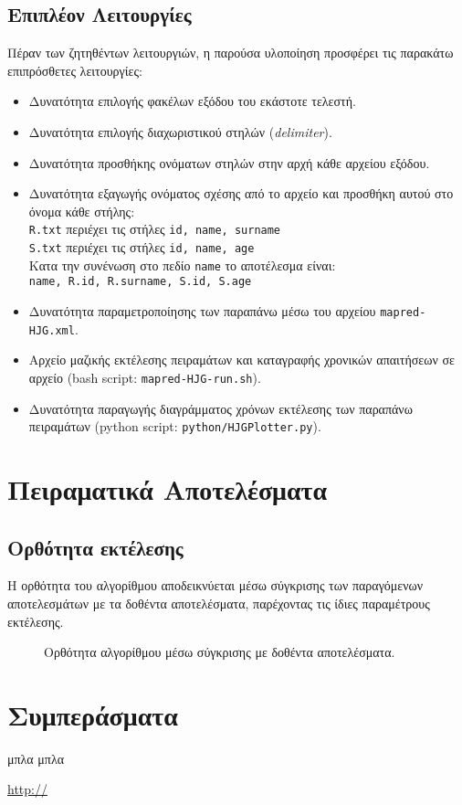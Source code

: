 \documentclass{article}
\newcommand{\en}[1]{\foreignlanguage{english}{#1}}
\begin{document}
\subsection{Επιπλέον Λειτουργίες} \label{subsec:Extras}

Πέραν των ζητηθέντων λειτουργιών, η παρούσα υλοποίηση προσφέρει τις παρακάτω επιπρόσθετες λειτουργίες:
\begin{itemize}
\item Δυνατότητα επιλογής φακέλων εξόδου του εκάστοτε τελεστή.
\item Δυνατότητα επιλογής διαχωριστικού στηλών (\emph{\en{delimiter}}).
\item Δυνατότητα προσθήκης ονόματων στηλών στην αρχή κάθε αρχείου εξόδου.
\item Δυνατότητα εξαγωγής ονόματος σχέσης από το αρχείο και προσθήκη αυτού στο όνομα κάθε στήλης: \\ \texttt{\en{R.txt}} περιέχει τις στήλες \texttt{\en{id, name, surname}} \\
 \texttt{\en{S.txt}} περιέχει τις στήλες \texttt{\en{id, name, age}} \\
 Κατα την συνένωση στο πεδίο \texttt{\en{name}} το αποτέλεσμα είναι:\\
  \texttt{\en{name, R.id, R.surname, S.id, S.age}}
\item Δυνατότητα παραμετροποίησης των παραπάνω μέσω του αρχείου \texttt{\en{mapred-HJG.xml}}.
\item Αρχείο μαζικής εκτέλεσης πειραμάτων και καταγραφής χρονικών απαιτήσεων σε αρχείο (\en{bash script}: \texttt{\en{mapred-HJG-run.sh}}).
\item Δυνατότητα παραγωγής διαγράμματος χρόνων εκτέλεσης των παραπάνω πειραμάτων (\en{python script}: \texttt{\en{python/HJGPlotter.py}}).
\end{itemize}
\section{Πειραματικά Αποτελέσματα} \label{sec:ExpRes}
\subsection{Ορθότητα εκτέλεσης} \label{subsec:Corr}
Η ορθότητα του αλγορίθμου αποδεικνύεται μέσω σύγκρισης των παραγόμενων αποτελεσμάτων με τα δοθέντα αποτελέσματα, παρέχοντας τις ίδιες παραμέτρους εκτέλεσης.

\begin{figure}[H]
\hspace*{-4.2cm}
\caption{Ορθότητα αλγορίθμου μέσω σύγκρισης με δοθέντα αποτελέσματα.\label{fig:Comm}
}
\end{figure}

\section{Συμπεράσματα} \label{sec:Eval}

μπλα μπλα

	\begin{thebibliography}{9}
		 \foreignlanguage{english}{\url{http://}}

	\end{thebibliography}
\end{document}

